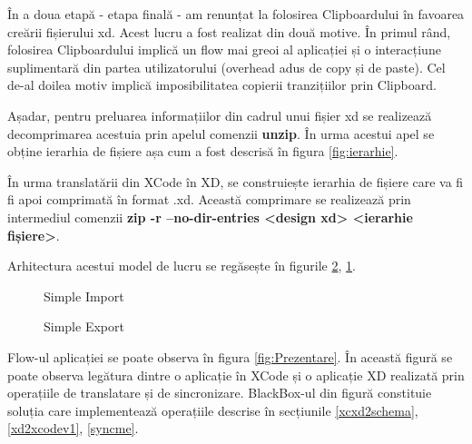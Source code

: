 În a doua etapă - etapa finală - am renunțat la folosirea Clipboardului în favoarea creării fișierului xd. 
Acest lucru a fost realizat din două motive. În primul rând, folosirea Clipboardului implică un flow mai greoi al aplicației și o interacțiune suplimentară din partea utilizatorului (overhead adus de copy și de paste). Cel de-al doilea motiv implică imposibilitatea copierii tranzițiilor prin Clipboard.

Așadar, pentru preluarea informațiilor din cadrul unui fișier xd se realizează decomprimarea acestuia prin apelul comenzii \textbf{unzip}. În urma acestui apel se obține ierarhia de fișiere așa cum a fost descrisă în figura \ref{fig:ierarhie}.

În urma translatării din XCode în XD, se construiește ierarhia de fișiere care va fi fi apoi comprimată în format .xd. Această comprimare se realizează prin intermediul comenzii \textbf{zip -r --no-dir-entries <design xd> <ierarhie fișiere>}. 

Arhitectura acestui model de lucru se regăsește în figurile \ref{fig:Export}, \ref{fig:Import}.

\begin{figure}[!htbp]
\centering
{}
\caption{Simple Import} \label{fig:Import}
\end{figure}

\begin{figure}[!htbp]
\centering
{}
\caption{Simple Export} \label{fig:Export}
\end{figure}

Flow-ul aplicației se poate observa în figura \ref{fig:Prezentare}. În această figură se poate observa legătura dintre o aplicație în XCode și o aplicație XD realizată prin operațiile de translatare și de sincronizare. BlackBox-ul din figură constituie soluția care implementează operațiile descrise în secțiunile \ref{xcxd2schema}, \ref{xd2xcodev1}, \ref{syncme}.

